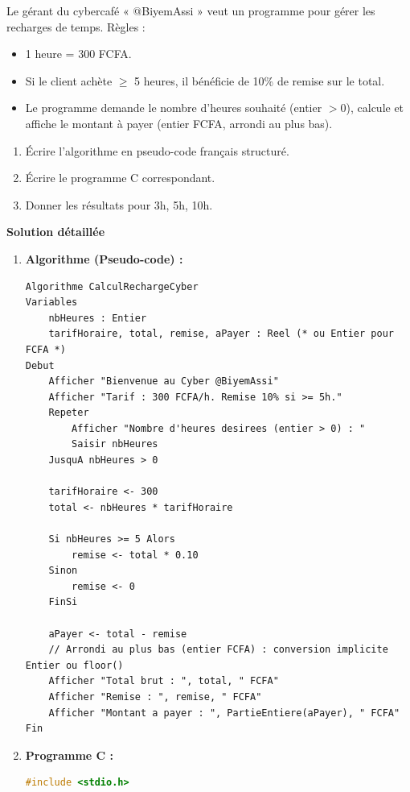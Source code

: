 \documentclass[11pt]{article}
\begin{document}
\begin{exoresolu}
    Le gérant du cybercafé « @BiyemAssi » veut un programme pour gérer les recharges de temps. 
    Règles : 
    \begin{itemize}
        \item 1 heure = 300 FCFA.
        \item Si le client achète $\ge$ 5 heures, il bénéficie de 10\% de remise sur le total.
        \item Le programme demande le nombre d'heures souhaité (entier $> 0$), calcule et affiche le montant à payer (entier FCFA, arrondi au plus bas).
    \end{itemize}
    \begin{enumerate}
        \item Écrire l'algorithme en pseudo-code français structuré.
        \item Écrire le programme C correspondant.
        \item Donner les résultats pour 3h, 5h, 10h.
    \end{enumerate}
    \tcblower
    \textbf{Solution détaillée}
    \begin{enumerate}
        \item \textbf{Algorithme (Pseudo-code) :}
        \begin{lstlisting}
Algorithme CalculRechargeCyber
Variables
    nbHeures : Entier
    tarifHoraire, total, remise, aPayer : Reel (* ou Entier pour FCFA *)
Debut
    Afficher "Bienvenue au Cyber @BiyemAssi"
    Afficher "Tarif : 300 FCFA/h. Remise 10% si >= 5h."
    Repeter
        Afficher "Nombre d'heures desirees (entier > 0) : "
        Saisir nbHeures
    JusquA nbHeures > 0
    
    tarifHoraire <- 300
    total <- nbHeures * tarifHoraire
    
    Si nbHeures >= 5 Alors
        remise <- total * 0.10
    Sinon
        remise <- 0
    FinSi
    
    aPayer <- total - remise
    // Arrondi au plus bas (entier FCFA) : conversion implicite Entier ou floor()
    Afficher "Total brut : ", total, " FCFA"
    Afficher "Remise : ", remise, " FCFA"
    Afficher "Montant a payer : ", PartieEntiere(aPayer), " FCFA"
Fin
        \end{lstlisting}
        \item \textbf{Programme C :}
        \begin{lstlisting}[language=C]
#include <stdio.h>


\end{lstlisting}
\end{enumerate}
\end{exoresolu}
\end{document}
